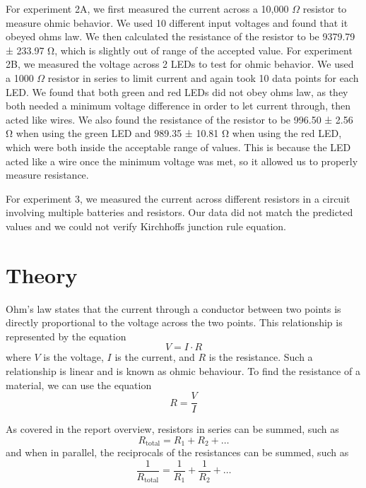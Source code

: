 \documentclass[11pt]{article}
\let\oldsection\section
\renewcommand\section{\clearpage\oldsection}
\begin{document}
    For experiment 2A, we first measured the current across a 10,000 $\Omega$ resistor to measure ohmic behavior. We used 10 different input voltages and found that it obeyed ohms law. We then calculated the resistance of the resistor to be 9379.79 ± 233.97 Ω, which is slightly out of range of the accepted value. For experiment 2B, we measured the voltage across 2 LEDs to test for ohmic behavior. We used a 1000 $\Omega$ resistor in series to limit current and again took 10 data points for each LED. We found that both green and red LEDs did not obey ohms law, as they both needed a minimum voltage difference in order to let current through, then acted like wires. We also found the resistance of the resistor to be 996.50 ± 2.56 Ω when using the green LED and 989.35 ± 10.81 Ω when using the red LED, which were both inside the acceptable range of values. This is because the LED acted like a wire once the minimum voltage was met, so it allowed us to properly measure resistance.

    For experiment 3, we measured the current across different resistors in a circuit involving multiple batteries and resistors. Our data did not match the predicted values and we could not verify Kirchhoffs junction rule equation.
    
    \section*{Theory}\label{sec:theory}
    Ohm's law states that the current through a conductor between two points is directly proportional to the voltage across the two points.
    This relationship is represented by the equation
    \begin{equation}\label{eq:ohm_equation}
        V = I \cdot R
    \end{equation}
    where $V$ is the voltage, $I$ is the current, and $R$ is the resistance.
    Such a relationship is linear and is known as ohmic behaviour.
    To find the resistance of a material, we can use the equation
    \begin{equation}\label{eq:resistance_equation}
        R = \frac{V}{I}
    \end{equation}

    As covered in the report overview, resistors in series can be summed, such as
    \begin{equation}\label{eq:resistors_in_series}
        R_{\text{total}} = R_1 + R_2 + \ldots
    \end{equation}
    and when in parallel, the reciprocals of the resistances can be summed, such as
    \begin{equation}\label{eq:resistors_in_parallel}
        \frac{1}{R_{\text{total}}} = \frac{1}{R_1} + \frac{1}{R_2} + \ldots
    \end{equation}
\end{document}
